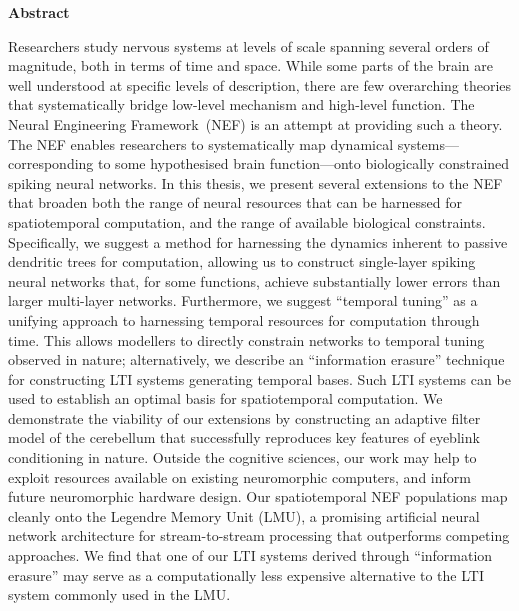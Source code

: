 \begin{center}\textbf{Abstract}\end{center}

Researchers study nervous systems at levels of scale spanning several orders of magnitude, both in terms of time and space.
While some parts of the brain are well understood at specific levels of description, there are few overarching theories that systematically bridge low-level mechanism and high-level function.
The Neural Engineering Framework~(NEF) is an attempt at providing such a theory.
The NEF enables researchers to systematically map dynamical systems---corresponding to some hypothesised brain function---onto biologically constrained spiking neural networks.
In this thesis, we present several extensions to the NEF that broaden both the range of neural resources that can be harnessed for spatiotemporal computation, and the range of available biological constraints.
Specifically, we suggest a method for harnessing the dynamics inherent to passive dendritic trees for computation, allowing us to construct single-layer spiking neural networks that, for some functions, achieve substantially lower errors than larger multi-layer networks.
Furthermore, we suggest \enquote{temporal tuning} as a unifying approach to harnessing temporal resources for computation through time.
This allows modellers to directly constrain networks to temporal tuning observed in nature; alternatively, we describe an \enquote{information erasure} technique for constructing LTI systems generating temporal bases.
Such LTI systems can be used to establish an optimal basis for spatiotemporal computation.
We demonstrate the viability of our extensions by constructing an adaptive filter model of the cerebellum that successfully reproduces key features of eyeblink conditioning in nature.
Outside the cognitive sciences, our work may help to exploit resources available on existing neuromorphic computers, and inform future neuromorphic hardware design.
Our spatiotemporal NEF populations map cleanly onto the Legendre Memory Unit (LMU), a promising artificial neural network architecture for stream-to-stream processing that outperforms competing approaches.
We find that one of our LTI systems derived through \enquote{information erasure} may serve as a computationally less expensive alternative to the LTI system commonly used in the LMU.

\clearpage